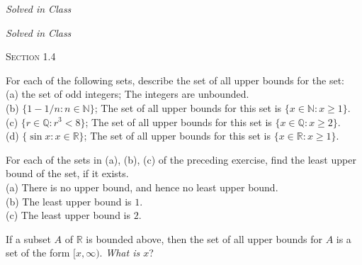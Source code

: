 \documentclass[12pt]{article}
\newenvironment{theorem}[2][Theorem]{\begin{trivlist}
\item[\hskip \labelsep {\bfseries #1}\hskip \labelsep {\bfseries #2.}]}{\end{trivlist}}
\newenvironment{exercise}[2][Exercise]{\begin{trivlist}
\item[\hskip \labelsep {\bfseries #1}\hskip \labelsep {\bfseries #2.}]}{\end{trivlist}}
\begin{document}
\begin{exercise}{1.1.14}
\emph{Solved in Class}
\end{exercise}

\begin{exercise}{1.1.15}
\emph{Solved in Class}
\end{exercise}

\begin{center}
\textsc{\Large Section 1.4}
\end{center}


\begin{exercise}{1.4.1}
For each of the following sets, describe the set of all upper bounds for the set: \\
(a) the set of odd integers; The integers are unbounded.\\
(b) $\{1 - 1/n : n \in \mathbb{N}\}$; The set of all upper bounds for this set is $\{x \in \mathbb{N}: x \geq 1\}$. \\
(c) $\{r \in \mathbb{Q}: r^3 < 8\}$; The set of all upper bounds for this set is $\{x \in \mathbb{Q}: x \geq 2\}$.\\
(d) $\{ \sin x : x \in \mathbb{R}\}$; The set of all upper bounds for this set is $\{x \in \mathbb{R}: x \geq 1\}$.
\end{exercise}



\begin{exercise}{1.4.2}
For each of the sets in (a), (b), (c) of the preceding exercise, find the least upper bound of the set, if it exists.\\

(a) There is no upper bound, and hence no least upper bound. \\
(b) The least upper bound is $1$.\\
(c) The least upper bound is $2$.
\end{exercise}



\begin{theorem}{1.4.3}
If a subset $A$ of $\mathbb{R}$ is bounded above, then the set of all upper bounds for $A$ is a set of the form $[x, \infty)$. \emph{What is $x$}?
\end{theorem}
\end{document}
